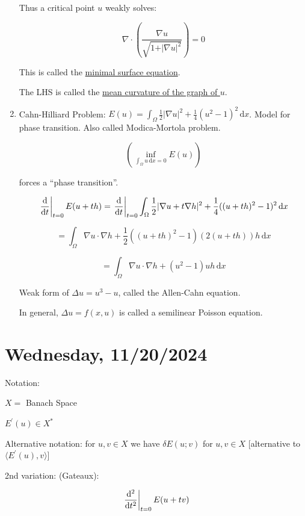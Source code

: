 \documentclass{article}
\theoremstyle{definition}
\begin{document}
\begin{enumerate}[label=\roman*)]
    Thus a critical point \(u\) weakly solves:

    \[
        \nabla \cdot \left( \frac{\nabla u}{\sqrt{1 + \vert \nabla u \vert^2} } \right) = 0
    \]

    This is called the \underline{minimal surface equation}.
    
    The LHS is called the \underline{mean curvature of the graph of \(u\)}.

    \item Cahn-Hilliard Problem: \(E(u) = \int_{\Omega} \frac{1}{2} \vert \nabla u \vert ^ 2 + \frac{1}{4} (u^2 - 1)^2 \,\mathrm{d}x \). Model for phase transition. Also called Modica-Mortola problem.
    
    \[
        \left( \inf_{\int_{\Omega} u \,\mathrm{d}x = 0} E(u) \right) 
    \]

    forces a ``phase transition''.

    \[
        \eval{\frac{\mathrm{d}}{\mathrm{d}t}}_{t=0} E(u+th) = \eval{\frac{\mathrm{d}}{\mathrm{d}t}}_{t=0} \int_{\Omega} \frac{1}{2} \vert \nabla u + t \nabla h \vert^2 + \frac{1}{4} ((u+th)^2 - 1)^2 \,\mathrm{d}x 
    \]

    \[
        = \int_{\Omega} \nabla u \cdot \nabla h + \frac{1}{2}((u+th)^2 - 1)(2(u+th))h \,\mathrm{d}x 
    \]

    \[
        = \int_{\Omega} \nabla u \cdot \nabla h + (u^2 - 1)uh \,\mathrm{d}x 
    \]

    Weak form of \(\Delta u = u^3 - u\), called the Allen-Cahn equation.

    In general, \(\Delta u = f(x,u)\) is called a semilinear Poisson equation.

\end{enumerate} 

\section*{Wednesday, 11/20/2024}

Notation:

\(X =\) Banach Space

\(E^{\prime} (u) \in X^{\ast}\) 

Alternative notation: for \(u,v\in X\) we have \(\delta E(u;v)\) for \(u,v\in X\) [alternative to \(\langle E^{\prime} (u), v \rangle\)]

2nd variation: (Gateaux):

\[
    \eval{\frac{\mathrm{d}^2}{\mathrm{d}t^2}}_{t=0}E(u+tv)
\]
\end{document}
